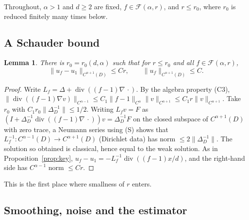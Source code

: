 \documentclass[11pt]{article}
\newtheorem{lemma}[theorem]{Lemma}
\theoremstyle{definition}
\theoremstyle{remark}
\newcommand{\Fc}{\mathcal F}
\newcommand{\dv}{\operatorname{div}}
\begin{document}
Throughout, $\alpha>1$ and $d\ge2$ are fixed, $f\in\Fc(\alpha,r)$, and $r\le r_0$, where $r_0$ is reduced finitely many times below.



\subsection{A Schauder bound}

\begin{lemma}\label{lem:C4}
There is $r_0=r_0(d,\alpha)$ such that for $r\le r_0$ and all $f\in\Fc(\alpha,r)$,
\begin{equation}\label{eq:C4}
\|u_f-u_1\|_{C^{\alpha+1}(D)}\le Cr,\qquad\|u_f\|_{C^{\alpha+1}(D)}\le C .
\end{equation}
\end{lemma}

\begin{proof}
Write $L_f=\Delta+\dv((f-1)\nabla\,\cdot)$. By the algebra property (C3),
$\|\dv((f-1)\nabla v)\|_{C^{\alpha-1}}\le C_1\|f-1\|_{C^\alpha}\|v\|_{C^{\alpha+1}}\le C_1r\|v\|_{C^{\alpha+1}}$.
Take $r_0$ with $C_1r_0\|\Delta_D^{-1}\|\le1/2$. Writing $L_fv=F$ as $(I+\Delta_D^{-1}\dv((f-1)\nabla\,\cdot))v=\Delta_D^{-1}F$ on the closed subspace of $C^{\alpha+1}(D)$ with zero trace, a Neumann series using (S) shows that $L_f^{-1}:C^{\alpha-1}(D)\to C^{\alpha+1}(D)$ (Dirichlet data) has norm $\le2\|\Delta_D^{-1}\|$. The solution so obtained is classical, hence equal to the weak solution. As in Proposition~\ref{prop:key}, $u_f-u_1=-L_f^{-1}\dv((f-1)x/d)$, and the right-hand side has $C^{\alpha-1}$ norm $\le Cr$.
\end{proof}

This is the first place where smallness of $r$ enters.

\subsection{Smoothing, noise and the estimator}
\end{document}
